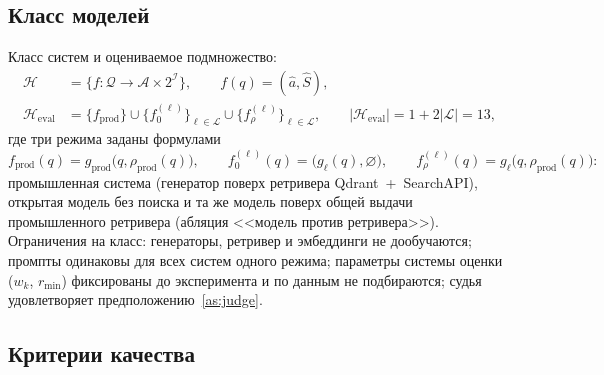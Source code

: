 \documentclass{article}
\newcommand{\Heval}{\mathcal{H}_{\mathrm{eval}}}
\newcommand{\Lm}{\mathcal{L}}
\newcommand{\fprod}{f_{\mathrm{prod}}}
\newcommand{\gprod}{g_{\mathrm{prod}}}
\newcommand{\rprod}{\rho_{\mathrm{prod}}}
\newcommand{\rmin}{r_{\min}}
\begin{document}
\subsection{Класс моделей}

Класс систем и оцениваемое подмножество:
\begin{align}
  \mathcal{H}&=\{f:\mathcal{Q}\to\mathcal{A}\times2^{\mathcal{I}}\},\qquad f(q)=(\hat a,\hat S),\label{eq:H}\\
  \Heval&=\{\fprod\}\cup\{f_0^{(\ell)}\}_{\ell\in\Lm}\cup\{f_\rho^{(\ell)}\}_{\ell\in\Lm},\qquad|\Heval|=1+2|\Lm|=13,\label{eq:Heval}
\end{align}
где три режима заданы формулами
\begin{equation}\label{eq:modes}
  \fprod(q)=\gprod\bigl(q,\rprod(q)\bigr),\qquad
  f_0^{(\ell)}(q)=\bigl(g_\ell(q),\varnothing\bigr),\qquad
  f_\rho^{(\ell)}(q)=g_\ell\bigl(q,\rprod(q)\bigr):
\end{equation}
промышленная система (генератор поверх ретривера Qdrant~+~SearchAPI), открытая модель без поиска и та же модель поверх общей выдачи промышленного ретривера (абляция <<модель против ретривера>>). Ограничения на класс: генераторы, ретривер и эмбеддинги не дообучаются; промпты одинаковы для всех систем одного режима; параметры системы оценки ($w_k$, $\rmin$) фиксированы до эксперимента и по данным не подбираются; судья удовлетворяет предположению~\ref{as:judge}.

\subsection{Критерии качества}
\end{document}
